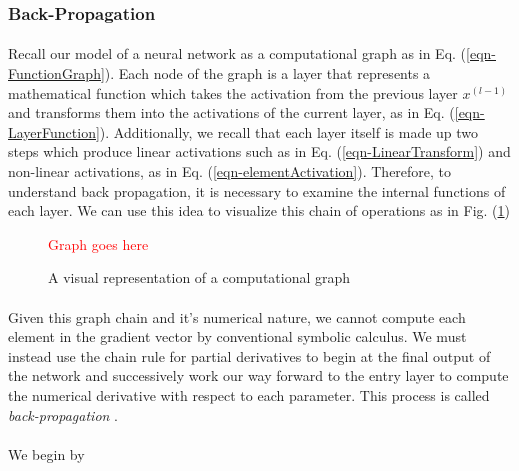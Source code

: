 \documentclass[12pt,letterpaper]{article}
\begin{document}

\subsubsection{Back-Propagation}
\label{subsubsec-BackProp}

\paragraph*{}Recall our model of a neural network as a computational graph as in Eq. (\ref{eqn-FunctionGraph}). Each node of the graph is a layer that represents a mathematical function which takes the activation from the previous layer $x^{(l-1)}$ and transforms them into the activations of the current layer, as in Eq. (\ref{eqn-LayerFunction}). Additionally, we recall that each layer itself is made up two steps which produce linear activations such as in Eq. (\ref{eqn-LinearTransform}) and non-linear activations, as in Eq. (\ref{eqn-elementActivation}). Therefore, to understand back propagation, it is necessary to examine the internal functions of each layer. We can use this idea to visualize this chain of operations as in Fig. (\ref{fig-ComputationalGraph})
\begin{figure}[H]
\begin{center}
\textcolor{red}{Graph goes here}
\end{center}
\caption{A visual representation of a computational graph}
\label{fig-ComputationalGraph}
\end{figure}

\paragraph*{}Given this graph chain and it's numerical nature, we cannot compute each element in the gradient vector by conventional symbolic calculus. We must instead use the chain rule for partial derivatives to begin at the final output of the network and successively work our way forward to the entry layer to compute the numerical derivative with respect to each parameter. This process is called \textit{back-propagation} \cite{Geron,Goodfellow,Loy}.

\paragraph*{}We begin by 
\end{document}
